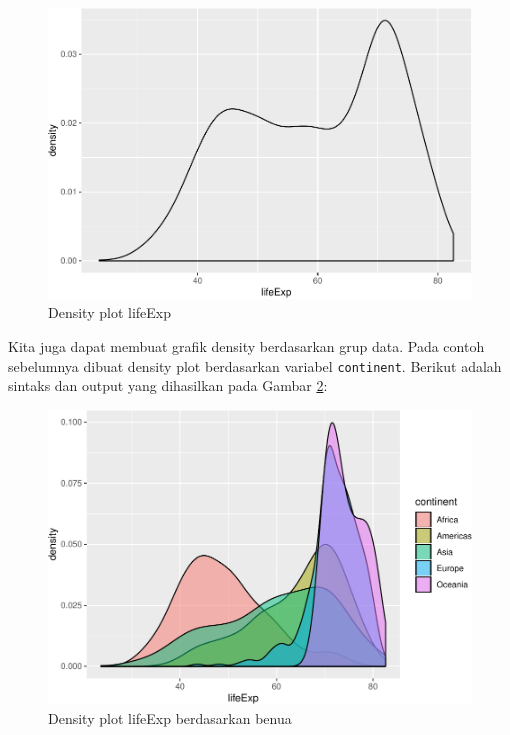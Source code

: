 \documentclass[]{book}
\newenvironment{Shaded}{\begin{snugshade}}{\end{snugshade}}
\newcommand{\KeywordTok}[1]{\textcolor[rgb]{0.13,0.29,0.53}{\textbf{#1}}}
\newcommand{\DataTypeTok}[1]{\textcolor[rgb]{0.13,0.29,0.53}{#1}}
\newcommand{\FloatTok}[1]{\textcolor[rgb]{0.00,0.00,0.81}{#1}}
\newcommand{\StringTok}[1]{\textcolor[rgb]{0.31,0.60,0.02}{#1}}
\newcommand{\CommentTok}[1]{\textcolor[rgb]{0.56,0.35,0.01}{\textit{#1}}}
\newcommand{\OperatorTok}[1]{\textcolor[rgb]{0.81,0.36,0.00}{\textbf{#1}}}
\newcommand{\NormalTok}[1]{#1}
\begin{document}
\begin{figure}

{\centering \includegraphics[width=0.7\linewidth]{EnvStat_files/figure-latex/ggdens-1} 

}

\caption{Density plot lifeExp }\label{fig:ggdens}
\end{figure}

Kita juga dapat membuat grafik density berdasarkan grup data. Pada
contoh sebelumnya dibuat density plot berdasarkan variabel
\texttt{continent}. Berikut adalah sintaks dan output yang dihasilkan
pada Gambar \ref{fig:ggdens2}:

\begin{Shaded}
\end{Shaded}

\begin{figure}

{\centering \includegraphics[width=0.7\linewidth]{EnvStat_files/figure-latex/ggdens2-1} 

}

\caption{Density plot lifeExp berdasarkan benua}\label{fig:ggdens2}
\end{figure}
\end{document}
